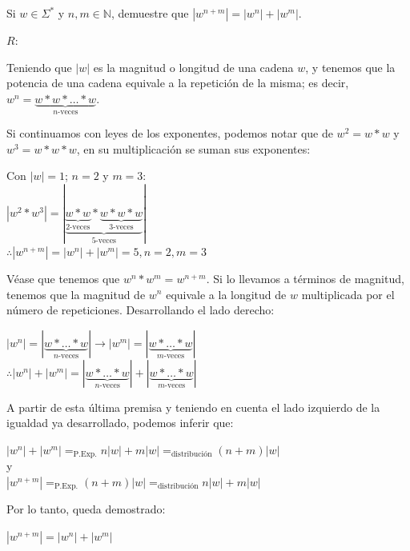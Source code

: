 Si $w \in \Sigma^*$ y $n,m \in \mathbb{N}$, demuestre que $|w^{n+m}| = |w^n| + |w^m|$.

$R: $

Teniendo que $|w|$ es la magnitud o longitud de una cadena $w$, y tenemos que la potencia de una cadena equivale a la repetición de la misma; es decir, $w^n = \underbrace{w*w*\ldots*w}_{n\text{-veces}}$.

Si continuamos con leyes de los exponentes, podemos notar que de $w^2 = w*w$ y $w^3 = w*w*w$, en su multiplicación se suman sus exponentes:
\begin{center}
    Con $|w| = 1$; $n=2$ y $m=3$:\\
    $|w^2 * w^3| = |\underbrace{\underbrace{w*w}_{2\text{-veces}}*\underbrace{w*w*w}_{3\text{-veces}}}_{5\text{-veces}}|$\\
    $\therefore |w^{n+m}| = |w^n| + |w^m| = 5, n=2, m=3$
\end{center}

Véase que tenemos que $w^n * w^m = w^{n+m}$. Si lo llevamos a términos de magnitud, tenemos que la magnitud de \(w^n\) equivale a la longitud de \(w\) multiplicada por el número de repeticiones. Desarrollando el lado derecho:

\begin{center}
    $|w^n| = |\underbrace{w*\ldots*w}_{n\text{-veces}}| \rightarrow |w^m| = |\underbrace{w*\ldots*w}_{m\text{-veces}}|$\\
    $\therefore |w^n| + |w^m| = |\underbrace{w*\ldots*w}_{n\text{-veces}}| + |\underbrace{w*\ldots*w}_{m\text{-veces}}|$
\end{center}

A partir de esta última premisa y teniendo en cuenta el lado izquierdo de la igualdad ya desarrollado, podemos inferir que:
\begin{center}
    $|w^n| + |w^m| =_{\text{P.Exp.}} n|w| + m|w| =_{\text{distribución}} (n+m)|w|$\\
    y\\
    $|w^{n+m}| =_{\text{P.Exp.}} (n+m)|w| =_{\text{distribución}} n|w| + m|w|$\\
\end{center}

Por lo tanto, queda demostrado:
\begin{center}
    $\boxed{|w^{n+m}| = |w^n| + |w^m|}$
\end{center}
